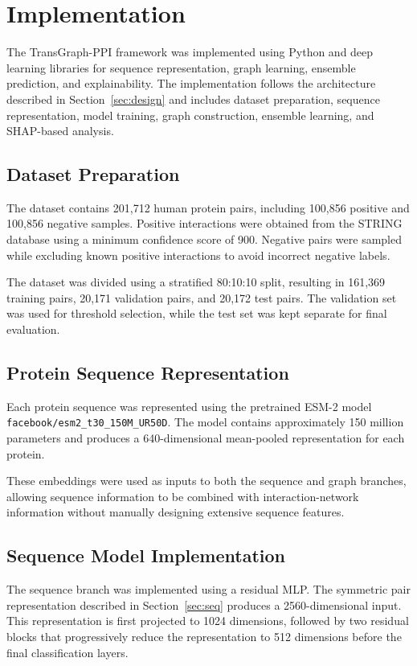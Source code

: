 \documentclass[conference]{IEEEtran}
\begin{document}
\section{Implementation}\label{sec:impl}
The TransGraph-PPI framework was implemented using Python and deep learning
libraries for sequence representation, graph learning, ensemble prediction, and
explainability. The implementation follows the architecture described in
Section~\ref{sec:design} and includes dataset preparation, sequence
representation, model training, graph construction, ensemble learning, and
SHAP-based analysis.

\subsection{Dataset Preparation}
The dataset contains 201,712 human protein pairs, including 100,856 positive
and 100,856 negative samples. Positive interactions were obtained from the
STRING database using a minimum confidence score of 900. Negative pairs were
sampled while excluding known positive interactions to avoid incorrect negative
labels.

The dataset was divided using a stratified 80:10:10 split, resulting in 161,369
training pairs, 20,171 validation pairs, and 20,172 test pairs. The validation
set was used for threshold selection, while the test set was kept separate for
final evaluation.

\subsection{Protein Sequence Representation}
Each protein sequence was represented using the pretrained ESM-2 model
\texttt{facebook/esm2\_t30\_150M\_UR50D}. The model contains approximately 150
million parameters and produces a 640-dimensional mean-pooled representation
for each protein.

These embeddings were used as inputs to both the sequence and graph branches,
allowing sequence information to be combined with interaction-network
information without manually designing extensive sequence features.

\subsection{Sequence Model Implementation}
The sequence branch was implemented using a residual MLP. The symmetric pair
representation described in Section~\ref{sec:seq} produces a 2560-dimensional
input. This representation is first projected to 1024 dimensions, followed by
two residual blocks that progressively reduce the representation to 512
dimensions before the final classification layers.
\end{document}
